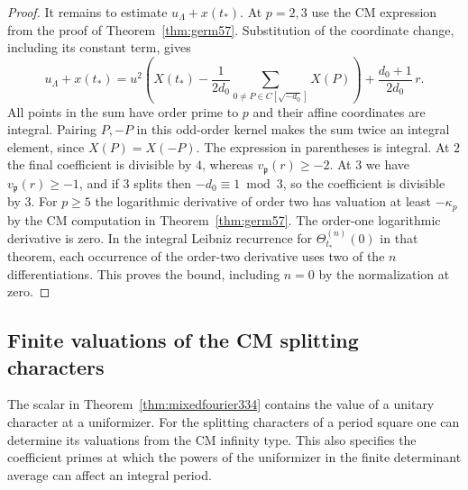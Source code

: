 \documentclass[a4paper,11pt]{article}
\theoremstyle{definition}
\theoremstyle{remark}
\numberwithin{equation}{section}
\begin{document}
\begin{proof}
It remains to estimate \(u_\Lambda+x(t_*)\). At \(p=2,3\) use the
CM expression from the proof of Theorem~\ref{thm:germ57}. Substitution
of the coordinate change, including its constant term, gives
\[
 u_\Lambda+x(t_*)=
 u^2\left(X(t_*)-\frac{1}{2d_0}
       \sum_{0\ne P\in C[\sqrt{-d_0}]}X(P)\right)
      +\frac{d_0+1}{2d_0}\,r .
\]
All points in the sum have order prime to \(p\) and their affine
coordinates are integral. Pairing \(P,-P\) in this odd-order kernel
makes the sum twice an integral element, since \(X(P)=X(-P)\).
The expression in parentheses is integral. At \(2\) the final
coefficient is divisible by \(4\), whereas \(v_{\mathfrak p}(r)\ge-2\).
At \(3\) we have \(v_{\mathfrak p}(r)\ge-1\), and if \(3\) splits
then \(-d_0\equiv1\bmod3\), so the coefficient is divisible by \(3\).
For \(p\ge5\) the logarithmic derivative of order two has valuation
at least \(-\kappa_p\) by the CM computation in
Theorem~\ref{thm:germ57}. The order-one logarithmic derivative is
zero. In the integral Leibniz recurrence for
\(\Theta_{t_*}^{(n)}(0)\) in that theorem, each occurrence of the
order-two derivative uses two of the \(n\) differentiations. This
proves the bound, including \(n=0\) by the normalization at zero.
\end{proof}

\subsection{Finite valuations of the CM splitting characters}\label{sec:cmplaces335}

The scalar in Theorem~\ref{thm:mixedfourier334} contains the value of
a unitary character at a uniformizer. For the splitting characters of a
period square one can determine its valuations from the CM infinity
type. This also specifies the coefficient primes at which the powers
of the uniformizer in the finite determinant average can affect an
integral period.
\end{document}
